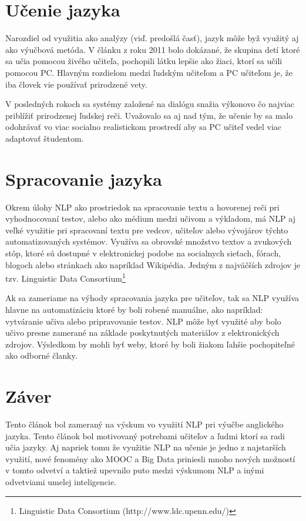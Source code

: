 \documentclass[10pt,slovak,a4paper,twoside]{article}
\begin{document}
\section{Učenie jazyka} \label{ucenie_pomocou_nlp}
	Narozdiel od využitia ako analýzy (viď. predošlá časť), jazyk môže byž využitý aj ako výučbová metóda.
	V článku z roku 2011\cite{clanok_o_studovani} bolo dokázané, že skupina detí ktoré sa učia pomocou živého učiteľa, 
	pochopili látku lepšie ako žiaci, ktorí sa učili pomocou PC. Hlavným rozdielom medzi ľudským učiteľom a PC učiteľom 
	je, že iba človek vie používať prirodzené vety.

	V posledných rokoch sa systémy založené na dialógu snažia výkonovo čo najviac
	priblížiť prirodzenej ľudskej reči. Uvažovalo sa aj nad tým, že učenie by sa malo odohrávať vo viac socialno 
	realistickom prostredí aby sa PC učiteľ vedel viac adaptovať študentom.
\section{Spracovanie jazyka} \label{spracovanie_jazyka}
	Okrem úlohy NLP ako prostriedok na spracovanie textu a hovorenej reči pri vyhodnocovaní testov, 
	alebo ako médium medzi učivom a výkladom, má NLP aj veľké využitie pri spracovaní textu pre vedcov, 
	učiteľov alebo vývojárov týchto automatizovaných systémov. Využíva sa obrovské množstvo textov a zvukových
	stôp, ktoré sú dostupné v elektronickej podobe na socialnych sieťach, fórach, blogoch alebo stránkach ako 
	napríklad Wikipédia. Jedným z najväčších zdrojov je tzv. Linguistic Data Consortium\footnote{Linguistic Data Consortium (http://www.ldc.upenn.edu/)}
	
	Ak sa zameriame na výhody spracovania jazyka pre učiteľov, tak sa NLP využíva hlavne na automatizáciu ktoré by boli robené manuálne, 
	ako napríklad: vytváranie učiva alebo pripravovanie testov. NLP môže byť využité aby bolo učivo presne zamerané na základe 
	poskytnutých materiálov z elektronických zdrojov. Výsledkom by mohli byť weby, ktoré by boli žiakom ľahšie pochopiteľné ako odborné članky\cite{miltsakaki2009matching}.

\section{Záver} \label{zaver} %
	Tento článok bol zameraný na výskum vo využití NLP pri výučbe anglického jazyka. Tento článok bol motivovaný 
	potrebami učiteľov a ľudmi ktorí sa radi učia jazyky. Aj napriek tomu že využitie NLP na učenie je jedno z najstarších využití, 
	nové fenomény ako MOOC a Big Data priniesli mnoho nových možností v tomto odvetví a taktiež upevnilo puto medzi výskumom NLP a inými 
	odvetviami umelej inteligencie.
\end{document}
